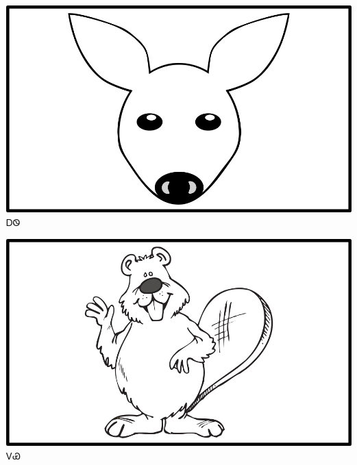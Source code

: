 \documentclass[avery5371]{flashcards}%
\begin{document}
    \begin{flashcard}{
        \includegraphics[width=0.95\columnwidth,height=.51\columnwidth,keepaspectratio]{../artwork/objects-animate/ahwi}
    }
        \Huge ᎠᏫ
    \end{flashcard}

    \begin{flashcard}{
        \includegraphics[width=0.95\columnwidth,height=.51\columnwidth,keepaspectratio]{../artwork/objects-animate/doya}
    }
        \Huge ᏙᏯ
    \end{flashcard}
\end{document}
